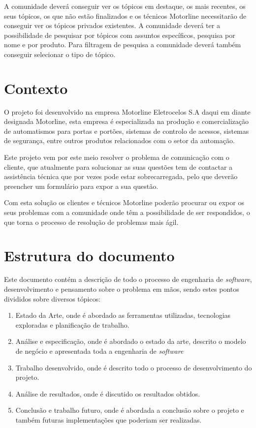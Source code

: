A comunidade deverá conseguir ver os tópicos em destaque, os mais recentes, os seus tópicos, os que não estão finalizados e os técnicos Motorline necessitarão de conseguir ver os tópicos privados existentes. A comunidade deverá ter a possibilidade de pesquisar por tópicos com assuntos específicos, pesquisa por nome e por produto. Para filtragem de pesquisa a comunidade deverá também conseguir selecionar o tipo de tópico.

\section{Contexto}
O projeto foi desenvolvido na empresa Motorline Eletrocelos S.A daqui em diante designada Motorline, esta empresa é especializada na produção e comercialização de automatismos para portas e portões, sistemas de controlo de acessos, sistemas de segurança, entre outros produtos relacionados com o setor da automação.

Este projeto vem por este meio resolver o problema de comunicação com o cliente, que atualmente para solucionar as suas questões tem de contactar a assistência técnica que por vezes pode estar sobrecarregada, pelo que deverão preencher um formulário para expor a sua questão.

Com esta solução os clientes e técnicos Motorline poderão procurar ou expor os seus problemas com a comunidade onde têm a possibilidade de ser respondidos, o que torna o processo de resolução de problemas mais ágil.

\newpage
\section{Estrutura do documento}

Este documento contém a descrição de todo o processo de engenharia de \textit{software}, desenvolvimento e pensamento sobre o problema em mãos, sendo estes pontos divididos sobre diversos tópicos:
\begin{enumerate}
  \item Estado da Arte, onde é abordado as ferramentas utilizadas, tecnologias exploradas e planificação de trabalho.
  \item Análise e especificação, onde é abordado o estado da arte, descrito o modelo de negócio e apresentada toda a engenharia de \textit{software}
  \item Trabalho desenvolvido, onde é descrito todo o processo de desenvolvimento do projeto.
  \item Análise de resultados, onde é discutido os resultados obtidos.
  \item Conclusão e trabalho futuro, onde é abordada a conclusão sobre o projeto e também futuras implementações que poderiam ser realizadas.
\end{enumerate}